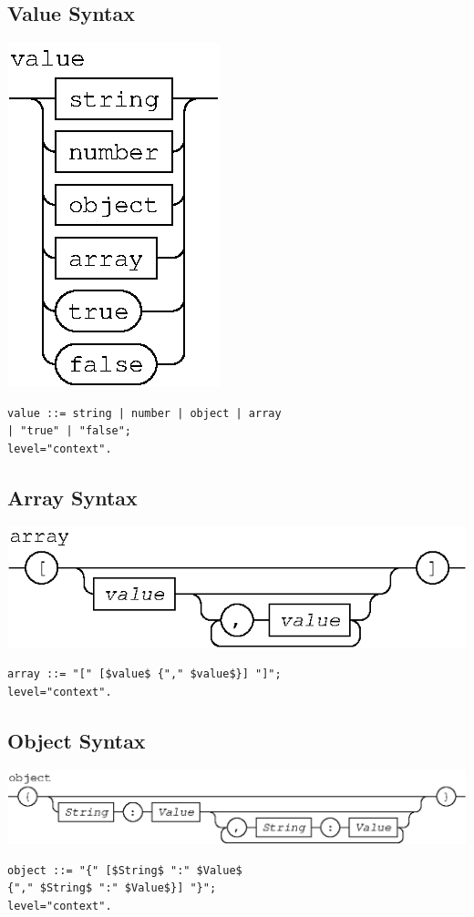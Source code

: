 \documentclass[a4paper]{article}
\begin{document}
\subsection{Value Syntax}
{\centering
	\includegraphics[scale=0.9]{Question1/value.eps}
}
\begin{lstlisting}[frame=single]
value ::= string | number | object | array 
| "true" | "false";
level="context".
\end{lstlisting}

\subsection{Array Syntax}
{\centering
	\includegraphics[scale=0.9]{Question1/array.eps}
}
\begin{lstlisting}[frame=single]
array ::= "[" [$value$ {"," $value$}] "]";
level="context".
\end{lstlisting}

\subsection{Object Syntax}
{\centering
	\includegraphics[scale=0.9]{Question1/object.eps}
}
\begin{lstlisting}[frame=single]
object ::= "{" [$String$ ":" $Value$ 
{"," $String$ ":" $Value$}] "}";
level="context".
\end{lstlisting}
\bigskip
\bigskip
\bigskip
\bigskip
\bigskip
\bigskip
\end{document}
